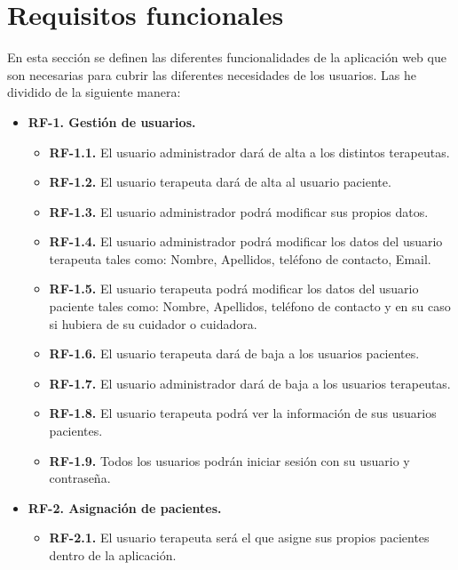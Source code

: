 \section{Requisitos funcionales}
En esta sección se definen las diferentes funcionalidades de la aplicación web que son necesarias para cubrir las diferentes necesidades de los usuarios. Las he dividido de la siguiente manera:  
\begin{itemize}
    \item \textbf{RF-1. Gestión de usuarios.}
    \begin{itemize}
        \item \textbf{RF-1.1.} El usuario administrador dará de alta a los distintos terapeutas.
        \item \textbf{RF-1.2.} El usuario terapeuta dará de alta al usuario paciente.
        \item \textbf{RF-1.3.} El usuario administrador podrá modificar sus propios datos.
        \item \textbf{RF-1.4.} El usuario administrador podrá modificar los datos del usuario terapeuta tales como: Nombre, Apellidos, teléfono de contacto, Email.
        \item \textbf{RF-1.5.} El usuario terapeuta podrá modificar los datos del usuario paciente tales como: Nombre, Apellidos, teléfono de contacto y en su caso si hubiera de su cuidador o cuidadora.
        \item \textbf{RF-1.6.} El usuario terapeuta dará de baja a los usuarios pacientes.
        \item \textbf{RF-1.7.} El usuario administrador dará de baja a los usuarios terapeutas.
        \item \textbf{RF-1.8.} El usuario terapeuta podrá ver la información de sus usuarios pacientes.
        \item \textbf{RF-1.9.} Todos los usuarios podrán iniciar sesión con su usuario y contraseña.
    \end{itemize}

    
    \item \textbf{RF-2. Asignación de pacientes.} 
    \begin{itemize}
        \item \textbf{RF-2.1.} El usuario terapeuta será el que asigne sus propios pacientes dentro de la aplicación.
    \end{itemize}
    

\end{itemize}
